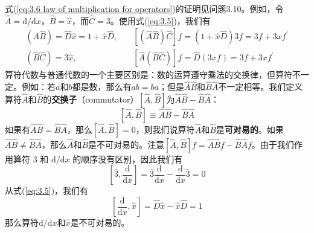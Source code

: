 	式(\ref{eq:3.6 law of multiplication for operators})的证明见问题3.10。例如，令$\hat{A} = \mathrm{d}/\mathrm{d}x$，$\hat{B} = \hat{x}$，而$\hat{C} = 3$。使用式(\ref{eq:3.5})，我们有
	\begin{equation*}
		\begin{aligned}
			\left(\hat{A}\hat{B}\right) = \hat{D}\hat{x} = 1+ \hat{x}\hat{D}, \quad & \left[\left(\hat{A}\hat{B}\right)\hat{C}\right]f = \left(1+\hat{x}\hat{D}\right)3f = 3f+3xf^{\prime}\\
			\left(\hat{B}\hat{C}\right) = 3\hat{x},  \qquad \quad \qquad & \left[\hat{A}\left(\hat{B}\hat{C}\right)\right]f = \hat{D}\left(3xf\right) = 3f+3xf^{\prime}
		\end{aligned}
	\end{equation*}
	\indent 算符代数与普通代数的一个主要区别是：数的运算遵守乘法的交换律，但算符不一定。例如：若$a$和$b$都是数，那么有$ab=ba$；但是$\hat{A}\hat{B}$和$\hat{B}\hat{A}$不一定相等。我们定义算符$\hat{A}$和$\hat{B}$的\textbf{交换子}（commutator）$\left[\hat{A},\hat{B}\right]$为$\hat{A}\hat{B}-\hat{B}\hat{A}$：
	\begin{equation}
		\boxed{
			\left[\hat{A},\hat{B}\right] \equiv \hat{A}\hat{B} - \hat{B}\hat{A}
		}
		\label{eq:3.7 definition of commutator for two operators}
	\end{equation}
	如果有$\hat{A}\hat{B} = \hat{B}\hat{A}$，那么$\left[\hat{A},\hat{B}\right] = 0$，则我们说算符$\hat{A}$和$\hat{B}$是\textbf{可对易的}。如果$\hat{A}\hat{B} \neq \hat{B}\hat{A}$，那么$\hat{A}$和$\hat{B}$是不可对易的。注意$\left[\hat{A}, \hat{B}\right]f = \hat{A}\hat{B}f - \hat{B}\hat{A}f$。由于我们作用算符 3 和 $\mathrm{d}/\mathrm{d}x$ 的顺序没有区别，因此我们有
	\begin{equation*}
		\left[\hat{3},\frac{\mathrm{d}}{\mathrm{d}x}\right] = \hat{3}\frac{\mathrm{d}}{\mathrm{d}x} - \frac{\mathrm{d}}{\mathrm{d}x}\hat{3} = 0
	\end{equation*}
	\indent 从式(\ref{eq:3.5})，我们有
	\begin{equation}
		\left[\frac{\mathrm{d}}{\mathrm{d}x}, \hat{x}\right] = \hat{D}\hat{x}-\hat{x}\hat{D} = 1
		\label{eq:3.8}
	\end{equation}
	那么算符$\mathrm{d}/\mathrm{d}x$和$\hat{x}$是不可对易的。\\
